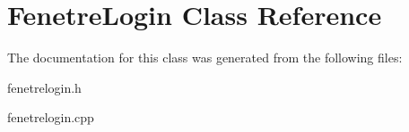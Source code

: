 \hypertarget{class_fenetre_login}{}\section{Fenetre\+Login Class Reference}
\label{class_fenetre_login}


The documentation for this class was generated from the following files\+:\begin{DoxyCompactItemize}
\item 
fenetrelogin.\+h\item 
fenetrelogin.\+cpp\end{DoxyCompactItemize}
